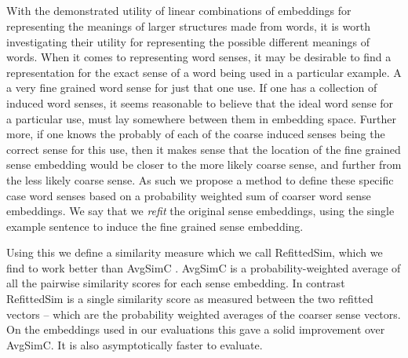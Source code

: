 \documentclass{book}
\begin{document}



\subsection{ }
With the demonstrated utility of linear combinations of embeddings for representing the meanings of larger structures made from words,
it is worth investigating their utility for representing the possible different meanings of words.
When it comes to representing word senses, it may be desirable to find a representation for the exact sense of a word being used in a particular example.
A a very fine grained word sense for just that one use.
If one has a collection of induced word senses, it seems reasonable to believe that the ideal word sense for a particular use, must lay somewhere between them in embedding space.
Further more, if one knows the probably of each of the coarse induced senses being the correct sense for this use,
then it makes sense that the location of the fine grained sense embedding would be closer to the more likely coarse sense,
and further from the less likely coarse sense.
As such we propose a method to define these specific case word senses based on a probability weighted sum of coarser word sense embeddings.
We say that we \emph{refit} the original sense embeddings, using the single example sentence to induce the fine grained sense embedding.

Using this we define a similarity measure which we call RefittedSim, which we find to work better than AvgSimC \citep{Reisinger2010}.
AvgSimC is a probability-weighted average of all the pairwise similarity scores for each sense embedding.
In contrast RefittedSim is a single similarity score as measured between the two refitted vectors -- which are the probability weighted averages of the coarser sense vectors.
On the embeddings used in our evaluations this gave a solid improvement over AvgSimC.
It is also asymptotically faster to evaluate.
\end{document}
